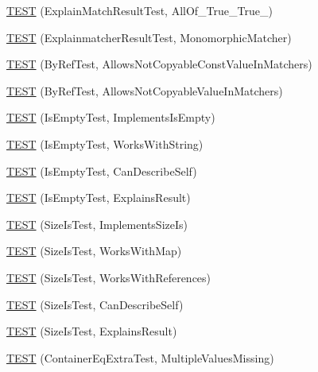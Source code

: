 \begin{DoxyCompactItemize}
\item 
\hyperlink{namespacetesting_1_1gmock__matchers__test_af1ba4010a24716a51a302f9a518023b5}{T\+E\+ST} (Explain\+Match\+Result\+Test, All\+Of\+\_\+\+True\+\_\+\+True\+\_)
\item 
\hyperlink{namespacetesting_1_1gmock__matchers__test_a102b10d9064f6e0037e3f3f0c3e76e22}{T\+E\+ST} (Explainmatcher\+Result\+Test, Monomorphic\+Matcher)
\item 
\hyperlink{namespacetesting_1_1gmock__matchers__test_aab82f120c70dc7d8bc2fd74ac6897486}{T\+E\+ST} (By\+Ref\+Test, Allows\+Not\+Copyable\+Const\+Value\+In\+Matchers)
\item 
\hyperlink{namespacetesting_1_1gmock__matchers__test_a5ed7b822889a34f018c2ba8f21941fd4}{T\+E\+ST} (By\+Ref\+Test, Allows\+Not\+Copyable\+Value\+In\+Matchers)
\item 
\hyperlink{namespacetesting_1_1gmock__matchers__test_ab63796f77c7572f6f1aef01cb140f99e}{T\+E\+ST} (Is\+Empty\+Test, Implements\+Is\+Empty)
\item 
\hyperlink{namespacetesting_1_1gmock__matchers__test_a22f0cacccee169b7390741b9815f4281}{T\+E\+ST} (Is\+Empty\+Test, Works\+With\+String)
\item 
\hyperlink{namespacetesting_1_1gmock__matchers__test_adcf3743190f973f2773296d0772e8950}{T\+E\+ST} (Is\+Empty\+Test, Can\+Describe\+Self)
\item 
\hyperlink{namespacetesting_1_1gmock__matchers__test_a1c168c284000d05d63bf5e9df10d1b7c}{T\+E\+ST} (Is\+Empty\+Test, Explains\+Result)
\item 
\hyperlink{namespacetesting_1_1gmock__matchers__test_abe619d5d1910e1f2e8b169622d1d8592}{T\+E\+ST} (Size\+Is\+Test, Implements\+Size\+Is)
\item 
\hyperlink{namespacetesting_1_1gmock__matchers__test_aea77169d6c56b88b5c99273d5a2bc0f2}{T\+E\+ST} (Size\+Is\+Test, Works\+With\+Map)
\item 
\hyperlink{namespacetesting_1_1gmock__matchers__test_a53bcd375786f69d889a8e8891ff8e0b0}{T\+E\+ST} (Size\+Is\+Test, Works\+With\+References)
\item 
\hyperlink{namespacetesting_1_1gmock__matchers__test_adc9720306de1626aa7e523637ca64dfa}{T\+E\+ST} (Size\+Is\+Test, Can\+Describe\+Self)
\item 
\hyperlink{namespacetesting_1_1gmock__matchers__test_a6c218845fd345302c490ef53f0d36995}{T\+E\+ST} (Size\+Is\+Test, Explains\+Result)
\item 
\hyperlink{namespacetesting_1_1gmock__matchers__test_ab84ac6cfde20f21ed69d5d7aa882ea1b}{T\+E\+ST} (Container\+Eq\+Extra\+Test, Multiple\+Values\+Missing)

\end{DoxyCompactItemize}
